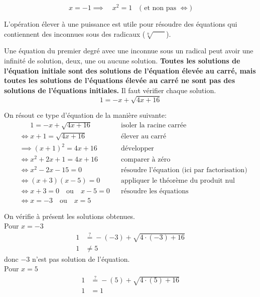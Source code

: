 \documentclass[a4paper,12pt]{article}
\begin{document}
\[x=-1 \implies \quad x^2=1 \quad \text{( et non pas } \iff )\]

L'opération \og{} élever à une puissance \fg{} est utile pour résoudre des équations qui contiennent des inconnues sous des radicaux ($\sqrt[n]{\phantom{test}}$).

\medskip
\begin{center}
\end{center}

\medskip

Une équation du premier degré avec une inconnue sous un radical peut avoir une infinité de solution, deux, une ou aucune solution. {\bfseries Toutes les solutions de l'équation initiale sont des solutions de l'équation élevée au carré, mais toutes les solutions de l'équations élevée au carré ne sont pas des solutions de l'équations initiales.} Il faut vérifier chaque solution.
\[1=-x+\sqrt{4 x + 16 }\]

On résout ce type d'équation de la manière suivante:
\begin{align*}
&\phantom{\iff} 1=-x+\sqrt{4 x + 16 }&&\text{isoler la racine carrée}\\
&\iff x + 1=\sqrt{4 x + 16 }&&\text{élever au carré}\\&\implies \left(x + 1\right)^2=4 x + 16 &&\text{développer}\\&\iff x^2 + 2 x + 1=4 x + 16 && \text{comparer à zéro}\\&\iff x^2-2 x-15 =0&& \text{résoudre l'équation (ici par factorisation)}\\&\iff \left (x + 3 \right)\left (x-5 \right)=0&& \text{appliquer le théorème du produit nul}\\&\iff x + 3 =0 \quad\text{ou} \quad x-5 =0&& \text{résoudre les équations}\\&\iff x=-3\quad \text{ou} \quad x=5
\end{align*}

On vérifie à présent les solutions obtenues.
      \\
      Pour $x=-3$
      \begin{align*}
      1 &\stackrel{?}{=} -\left(-3\right)+\sqrt{4\cdot \left(-3\right) + 16 } \\
      1  &\neq 5
      \end{align*}
      donc $-3$ n'est pas solution de l'équation.\\
      Pour $x=5$
      \begin{align*}
      1 &\stackrel{?}{=} -\left(5\right)+\sqrt{4\cdot \left(5\right) + 16 } \\
      1 &= 1      
\end{align*}
\end{document}
